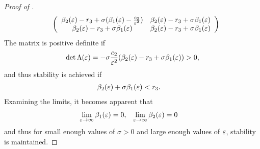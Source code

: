 \documentclass[twocolumn]{article}
\begin{document}
\begin{proof} [Proof of ]
\begin{align}
    \nonumber
    &&\left(\begin{array}{c c}
      \beta_{2}(\varepsilon) - r_{3} + \sigma (\beta_{1}(\varepsilon) - \frac{c_{2}}{\varepsilon^{2}}) & \beta_{2}(\varepsilon) - r_{3} + \sigma \beta_{1}(\varepsilon)\\
      \beta_{2}(\varepsilon) - r_{3} + \sigma \beta_{1}(\varepsilon) & \beta_{2}(\varepsilon) - r_{3} + \sigma \beta_{1}(\varepsilon)
    \end{array}\right)
  \end{align}
  The matrix is positive definite if
  \begin{align}
    \det \Lambda(\varepsilon) = -\sigma\frac{c_{2}}{\varepsilon^{2}} (\beta_{2}(\varepsilon) - r_{3} + \sigma \beta_{1}(\varepsilon)) > 0,
  \end{align}
  and thus stability is achieved if
  \begin{align}
    &\beta_{2}(\varepsilon) + \sigma \beta_{1}(\varepsilon) < r_{3}.
  \end{align}
  Examining the limits, it becomes apparent that
  \begin{align}
    \nonumber
    \lim_{\varepsilon \to \infty} \beta_{1}(\varepsilon) = 0, &&\lim_{\varepsilon \to \infty} \beta_{2}(\varepsilon) &= 0
  \end{align}
  and thus for small enough values of $\sigma > 0$ and large enough values of $\varepsilon$, stability is maintained. \qedhere
\end{proof}
\end{document}
